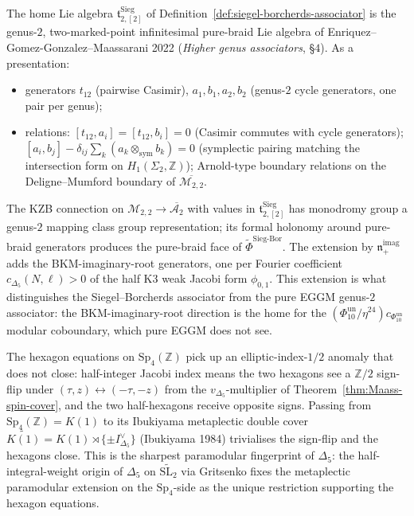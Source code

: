 \begin{remark}
\label{rem:genus-2-siegel-drinfeld-kohno}
The home Lie algebra $\mathfrak{t}^{\mathrm{Sieg}}_{2,[2]}$ of
Definition~\ref{def:siegel-borcherds-associator} is the genus-$2$, two-marked-point
infinitesimal pure-braid Lie algebra of Enriquez--Gomez-Gonzalez--Maassarani 2022
(\emph{Higher genus associators}, \S $4$). As a presentation:
\begin{itemize}
\item generators $t_{12}$ (pairwise Casimir), $a_1, b_1, a_2, b_2$ (genus-$2$ cycle
 generators, one pair per genus);
\item relations:
 $[t_{12}, a_i]=[t_{12}, b_i]=0$ (Casimir commutes with cycle generators);
 $[a_i, b_j]-\delta_{ij}\sum_k (a_k\otimes_{\mathrm{sym}} b_k)=0$ (symplectic pairing
 matching the intersection form on $H_1(\Sigma_2,\mathbb{Z})$);
 Arnold-type boundary relations on the Deligne--Mumford boundary of
 $\overline{\mathcal{M}_{2,2}}$.
\end{itemize}
The KZB connection on $\mathcal{M}_{2,2}\to\overline{\mathcal{A}_2}$ with values in
$\mathfrak{t}^{\mathrm{Sieg}}_{2,[2]}$ has monodromy group a genus-$2$ mapping class
group representation; its formal holonomy around pure-braid generators produces the
pure-braid face of $\widetilde{\Phi}^{\mathrm{Sieg\text{-}Bor}}$. The extension by
$\mathfrak{n}_+^{\mathrm{imag}}$ adds the BKM-imaginary-root generators, one per
Fourier coefficient $c_{\Delta_5}(N,\ell)>0$ of the half K3 weak Jacobi form $\phi_{0,1}$.
This extension is what distinguishes the Siegel--Borcherds associator from the pure
EGGM genus-$2$ associator: the BKM-imaginary-root direction is the home for the
$(\Phi_{10}^{\mathrm{un}}/\eta^{24})c_{\Phi_{10}^{\mathrm{un}}}$ modular coboundary, which pure EGGM does not see.
\end{remark}

\begin{remark}
\label{rem:hexagon-K1-restriction}
The hexagon equations on $\mathrm{Sp}_4(\mathbb{Z})$ pick up an elliptic-index-$1/2$
anomaly that does not close: half-integer Jacobi index means the two hexagons see
a $\mathbb{Z}/2$ sign-flip under $(\tau,z)\leftrightarrow(-\tau,-z)$ from the
$v_{\Delta_5}$-multiplier of Theorem~\ref{thm:Maass-spin-cover}, and the two
half-hexagons receive opposite signs. Passing from
$\mathrm{Sp}_4(\mathbb{Z}) = K(1)$ to its Ibukiyama metaplectic double cover
$\widetilde{K(1)} = K(1)\rtimes\{\pm I^\vee_{\Delta_5}\}$
(Ibukiyama 1984) trivialises the sign-flip and the hexagons close. This is the
sharpest paramodular fingerprint of $\Delta_5$: the half-integral-weight
origin of $\Delta_5$ on $\widetilde{\mathrm{SL}_2}$ via Gritsenko fixes
the metaplectic paramodular extension on the $\mathrm{Sp}_4$-side as
the unique restriction supporting the hexagon equations.
\end{remark}

